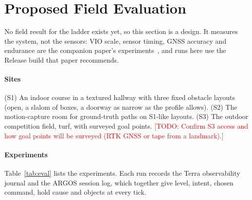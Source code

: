 \documentclass[conference]{IEEEtran}
\newcommand{\todo}[1]{\textcolor{red}{[TODO: #1]}}
\begin{document}
\section{Proposed Field Evaluation}
\label{sec:eval}

No field result for the ladder exists yet, so this section is a design.
It measures the system, not the sensors: VIO scale, sensor timing, GNSS accuracy and endurance are the companion paper's experiments~\cite{companion2026phone}, and runs here use the Release build that paper recommends.

\paragraph{Sites}
(S1) An indoor course in a textured hallway with three fixed obstacle layouts (open, a slalom of boxes, a doorway as narrow as the profile allows).
(S2) The motion-capture room for ground-truth paths on S1-like layouts.
(S3) The outdoor competition field, turf, with surveyed goal points.
\todo{Confirm S3 access and how goal points will be surveyed (RTK GNSS or tape from a landmark).}

\paragraph{Experiments}
Table~\ref{tab:eval} lists the experiments.
Each run records the Terra observability journal and the ARGOS session log, which together give level, intent, chosen command, hold cause and objects at every tick.
\end{document}
